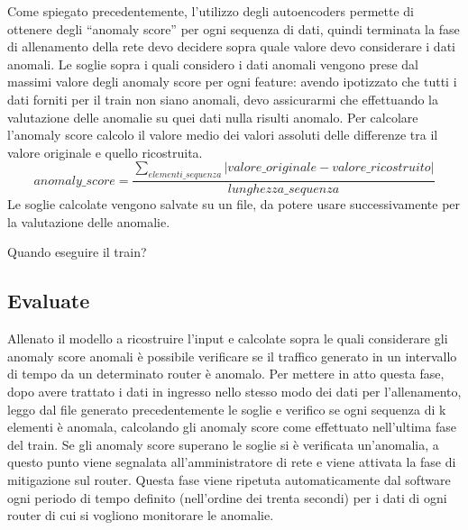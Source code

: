 Come spiegato precedentemente, l'utilizzo degli autoencoders permette di ottenere degli ``anomaly score'' per ogni sequenza di dati, quindi terminata la fase di allenamento della rete devo decidere sopra quale valore devo considerare i dati anomali.
Le soglie sopra i quali considero i dati anomali vengono prese dal massimi valore degli anomaly score per ogni feature: avendo ipotizzato che tutti i dati forniti per il train non siano anomali, devo assicurarmi che effettuando la valutazione delle anomalie su quei dati nulla risulti anomalo.
Per calcolare l'anomaly score calcolo il valore medio dei valori assoluti delle differenze tra il valore originale e quello ricostruita.
\begin{equation}
    anomaly\_score = \frac{\sum_{elementi\_sequenza}\lvert valore\_originale - valore\_ricostruito \rvert}{lunghezza\_sequenza}
\end{equation}
Le soglie calcolate vengono salvate su un file, da potere usare successivamente per la valutazione delle anomalie.

Quando eseguire il train?






\subsection{Evaluate}
Allenato il modello a ricostruire l'input e calcolate sopra le quali considerare gli anomaly score anomali è possibile verificare se il traffico generato in un intervallo di tempo da un determinato router è anomalo.  
Per mettere in atto questa fase, dopo avere trattato i dati in ingresso nello stesso modo dei dati per l'allenamento, leggo dal file generato precedentemente le soglie e verifico se ogni sequenza di k elementi è anomala, calcolando gli anomaly score come effettuato nell'ultima fase del train. Se gli anomaly score superano le soglie si è verificata un'anomalia, a questo punto viene segnalata all'amministratore di rete e viene attivata la fase di mitigazione sul router.
Questa fase viene ripetuta automaticamente dal software ogni periodo di tempo definito (nell'ordine dei trenta secondi) per i dati di ogni router di cui si vogliono monitorare le anomalie.

